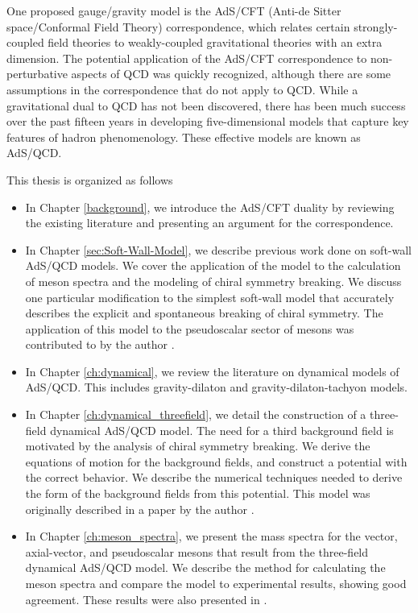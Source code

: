 One proposed gauge/gravity model is the AdS/CFT (Anti-de Sitter space/Conformal Field Theory) correspondence, which relates certain strongly-coupled field theories to weakly-coupled gravitational theories with an extra dimension.
The potential application of the AdS/CFT correspondence to non-perturbative aspects of QCD was quickly recognized, although there are some assumptions in the correspondence that do not apply to QCD.
While a gravitational dual to QCD has not been discovered, there has been much success over the past fifteen years in developing five-dimensional models that capture key features of hadron phenomenology.
These effective models are known as AdS/QCD.

This thesis is organized as follows
\begin{itemize}

\item In Chapter \ref{background}, we introduce the AdS/CFT duality by reviewing the existing literature and presenting an argument for the correspondence.

\item In Chapter \ref{sec:Soft-Wall-Model}, we describe previous work done on soft-wall AdS/QCD models. 
We cover the application of the model to the calculation of meson spectra and the modeling of chiral symmetry breaking.
We discuss one particular modification to the simplest soft-wall model that accurately describes the explicit and spontaneous breaking of chiral symmetry. 
The application of this model to the pseudoscalar sector of mesons was contributed to by the author \cite{bartz-pions}.

\item In Chapter \ref{ch:dynamical}, we review the literature on dynamical models of AdS/QCD. 
This includes gravity-dilaton and gravity-dilaton-tachyon models.

\item In Chapter \ref{ch:dynamical_threefield}, we detail the construction of a three-field dynamical AdS/QCD model.
The need for a third background field is motivated by the analysis of chiral symmetry breaking. 
We derive the equations of motion for the background fields, and construct a potential with the correct behavior.
We describe the numerical techniques needed to derive the form of the background fields from this potential.
This model was originally described in a paper by the author \cite{Bartz2014}.

\item In Chapter \ref{ch:meson_spectra}, we present the mass spectra for the vector, axial-vector, and pseudoscalar mesons that result from the three-field dynamical AdS/QCD model.
We describe the method for calculating the meson spectra and compare the model to experimental results, showing good agreement. 
These results were also presented in \cite{Bartz2014}.


\end{itemize}
